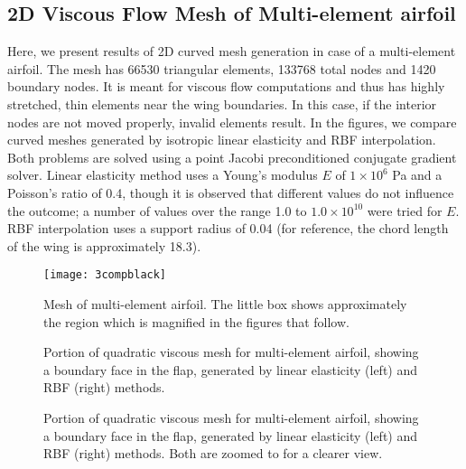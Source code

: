  \subsection{2D Viscous Flow Mesh of Multi-element airfoil}
 Here, we present results of 2D curved mesh generation in case of a multi-element airfoil. The mesh has 66530 triangular elements, 133768 total nodes and 1420 boundary nodes. It is meant for viscous flow computations and thus has highly stretched, thin elements near the wing boundaries. In this case, if the interior nodes are not moved properly, invalid elements result. In the figures, we compare curved meshes generated by isotropic linear elasticity and RBF interpolation. Both problems are solved using a point Jacobi preconditioned conjugate gradient solver. Linear elasticity method uses a Young's modulus $E$ of $1\times 10^6$ Pa and a Poisson's ratio of 0.4, though it is observed that different values do not influence the outcome; a number of values over the range 1.0 to $1.0 \times 10^{10}$ were tried for $E$. RBF interpolation uses a support radius of 0.04 (for reference, the chord length of the wing is approximately 18.3).
 
 \begin{figure}
 	\centering
 	\texttt{[image: 3compblack]}
 	\caption{Mesh of multi-element airfoil. The little box shows approximately the region which is magnified in the figures that follow.}
 \end{figure}
 
 \begin{figure}
 	\centering
 	\caption{Portion of quadratic viscous mesh for multi-element airfoil, showing a boundary face in the flap, generated by linear elasticity (left) and RBF (right) methods.}
 	\label{fig:tangled1}
 \end{figure}
 
 \begin{figure}
 	\centering
 	\caption{Portion of quadratic viscous mesh for multi-element airfoil, showing a boundary face in the flap, generated by linear elasticity (left) and RBF (right) methods. Both are zoomed to for a clearer view.}
 	\label{fig:tangled2}
 \end{figure}
 
